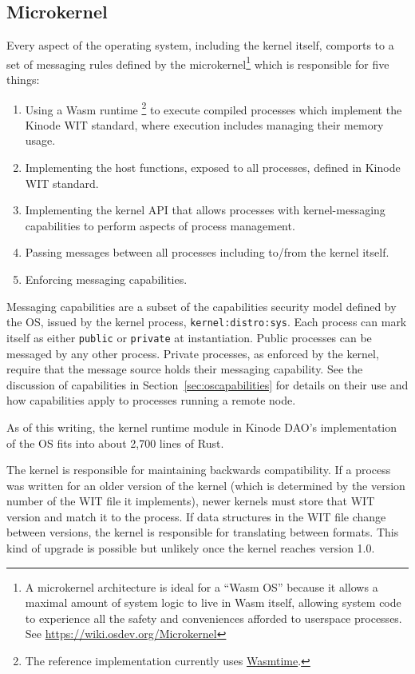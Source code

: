 \documentclass[runningheads]{llncs}
\begin{document}
\subsection{Microkernel}
\label{sec:osmicrokernel}

Every aspect of the operating system, including the kernel itself, comports to a set of messaging rules defined by the microkernel\footnote{A microkernel architecture is ideal for a ``Wasm OS'' because it allows a maximal amount of system logic to live in Wasm itself, allowing system code to experience all the safety and conveniences afforded to userspace processes. See \url{https://wiki.osdev.org/Microkernel}} which is responsible for five things:
\begin{enumerate}
    \item Using a Wasm runtime
    \footnote{The reference implementation currently uses \href{https://wasmtime.dev}{Wasmtime}.}
    to execute compiled processes which implement the Kinode WIT standard, where execution includes managing their memory usage.
    \item Implementing the host functions, exposed to all processes, defined in Kinode WIT standard.
    \item Implementing the kernel API that allows processes with kernel-messaging capabilities to perform aspects of process management.
    \item Passing messages between all processes including to/from the kernel itself.
    \item Enforcing messaging capabilities.
\end{enumerate}

Messaging capabilities are a subset of the capabilities security model defined by the OS, issued by the kernel process, \verb|kernel:distro:sys|.
Each process can mark itself as either \verb|public| or \verb|private| at instantiation.
Public processes can be messaged by any other process.
Private processes, as enforced by the kernel, require that the message source holds their messaging capability.
See the discussion of capabilities in Section~\ref{sec:oscapabilities} for details on their use and how capabilities apply to processes running a remote node.

As of this writing, the kernel runtime module in Kinode DAO's implementation of the OS fits into about 2,700 lines of Rust.

The kernel is responsible for maintaining backwards compatibility.
If a process was written for an older version of the kernel (which is determined by the version number of the WIT file it implements), newer kernels must store that WIT version and match it to the process.
If data structures in the WIT file change between versions, the kernel is responsible for translating between formats.
This kind of upgrade is possible but unlikely once the kernel reaches version 1.0.
\end{document}
